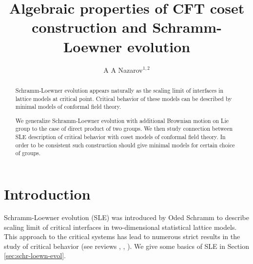 \documentclass[a4paper]{jpconf}
\theoremstyle{definition}
\theoremstyle{definition} \newtheorem{Def}{Definition}
\begin{document}
\title{Algebraic properties of CFT coset construction and Schramm-Loewner evolution}
\author{A A Nazarov$^{1,2}$}
\address{
  $^1$ Department of High-Energy and Elementary Particle Physics, 
  Faculty of Physics, \\ SPb State University
  198904, Saint-Petersburg, Russia}
\address{
  $^{2}$ Chebyshev Laboratory,
  Faculty of Mathematics and Mechanics, \\ SPb State University
  199178, Saint-Petersburg, Russia}


\begin{abstract}
  Schramm-Loewner evolution appears naturally as the scaling limit of interfaces in lattice models at critical point. Critical behavior of these models can be described by minimal models of conformal field theory.

  We generalize Schramm-Loewner evolution with additional Brownian motion on Lie group to the case of direct product of two groups. We then study connection between SLE description of critical behavior with coset models of conformal field theory. In order to be consistent such construction should give minimal models for certain choice of groups. 

\end{abstract}

\section{Introduction}
Schramm-Loewner evolution (SLE) was introduced by Oded Schramm  \cite{schramm2000scaling} to describe scaling limit of critical interfaces in two-dimensional statistical lattice models. This approach to the critical systems has lead to numerous strict results in the study of critical behavior (see reviews  \cite{rohde2005basic}, \cite{bauer20062d}, \cite{Cardy:2005kh}). We give some basics of SLE in Section \ref{sec:schr-loewn-evol}.  
\end{document}

